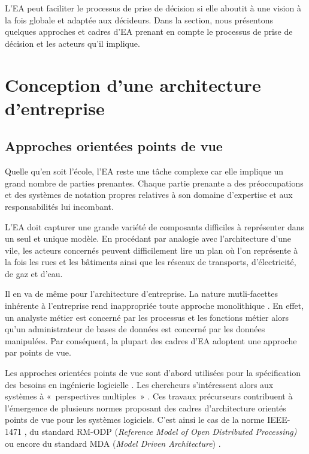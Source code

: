 L'EA peut faciliter le processus de prise de décision si elle aboutit à une 
vision à la fois globale et adaptée aux décideurs. Dans la section, nous 
présentons quelques approches et cadres d'EA prenant en compte le processus de 
prise de décision et les acteurs qu'il implique.

\section{Conception d'une architecture d'entreprise}

	\subsection{Approches orientées points de vue}

Quelle qu'en soit l'école, l'EA reste une tâche complexe 
\cite{steen2004supporting} car elle implique un grand nombre de parties 
prenantes. Chaque partie prenante a des préoccupations et des systèmes de 
notation propres relatives à son domaine d'expertise et aux responsabilités lui 
incombant.

L'EA doit capturer une grande variété de composants difficiles à représenter 
dans un seul et unique modèle. En procédant par analogie avec l'architecture 
d'une vile, les acteurs concernés peuvent difficilement lire un plan où l'on 
représente à la fois les rues et les bâtiments ainsi que les réseaux de 
transports, d'électricité, de gaz et d'eau. 

Il en va de même pour l'architecture d'entreprise. La nature mutli-facettes 
inhérente à l'entreprise rend inappropriée toute approche monolithique 
\cite{armour1999bigpicture}. En effet, un analyste métier est concerné par les 
processus et les fonctions métier alors qu'un administrateur de bases de données 
est concerné par les données manipulées. Par conséquent, la plupart des cadres 
d'EA adoptent une approche par points de vue.

Les approches orientées points de vue sont d'abord utilisées pour la 
spécification des besoins en ingénierie logicielle \cite{mullery1979core}. Les 
chercheurs s'intéressent alors aux systèmes à «~perspectives multiples~» 
\cite{finkelstein1992viewpoints} \cite{kotonya1996requirements} 
\cite{nuseibeh1994multi} \cite{meyers1993representing}. Ces travaux précurseurs 
contribuent à l'émergence de plusieurs normes proposant des cadres 
d'architecture orientés points de vue pour les systèmes logiciels. C'est ainsi 
le cas de la norme IEEE-1471 \cite{hilliard2000ieee}, du standard RM-ODP 
(\textit{Reference Model of Open Distributed Processing)} 
\cite{raymond1995reference} ou encore du standard MDA (\textit{Model Driven 
Architecture}) \cite{kleppe2003mda}.

